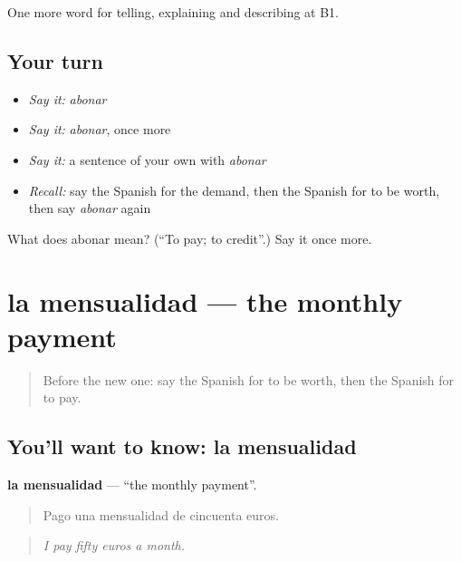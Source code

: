 \begin{grammarlens}[title={What you've built}]
One more word for telling, explaining and describing at B1.
\end{grammarlens}

\subsection*{Your turn}
\begin{itemize}
\raggedright
  \item \emph{Say it:} \emph{abonar}
  \item \emph{Say it:} \emph{abonar}, once more
  \item \emph{Say it:} a sentence of your own with \emph{abonar}
  \item \emph{Recall:} say the Spanish for the demand, then the Spanish for to be worth, then say \emph{abonar} again
\end{itemize}

\begin{tcolorbox}[breakable,colback=teal!4,colframe=teal!35!black,title={Before you move on}]
What does abonar mean? (\textquotedblleft{}To pay; to credit\textquotedblright{}.) Say it once more.
\end{tcolorbox}
\section[la mensualidad]{la mensualidad — the monthly payment}

\label{lesson:ES-C632-mensualidad}



\begin{quote}
Before the new one: say the Spanish for to be worth, then the Spanish for to pay.
\end{quote}

\subsection*{You'll want to know: la mensualidad}
\textbf{la mensualidad} — \textquotedblleft{}the monthly payment\textquotedblright{}.

\begin{quote}
Pago una mensualidad de cincuenta euros.
\end{quote}

\begin{quote}
\emph{I pay fifty euros a month.}
\end{quote}

